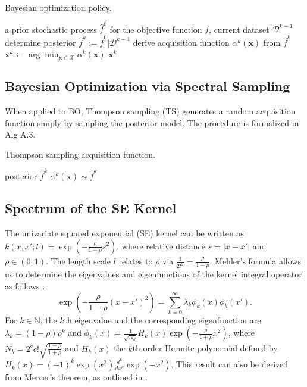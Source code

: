 \documentclass{article}
\begin{document}
\begin{algorithm}[h]
  \caption{Bayesian optimization policy.}
  \label{alg:BOpolicy}
  \begin{algorithmic}[1] %
    \Input a prior stochastic process $\widehat{f}^0$ for the objective function $f$, current dataset $\mathcal{D}^{k-1}$
    \State determine posterior
    $\widehat{f}^k := \widehat{f}^0 | \mathcal{D}^{k-1}$
    \State derive acquisition function $\alpha^k(\mathbf{x})$ from
    $\widehat{f}^k$
    \State $\mathbf{x}^k \gets \arg\min_{\mathbf{x} \in \mathcal{X}} \alpha^k(\mathbf{x})$
    \State \Return $\mathbf{x}^k$
  \end{algorithmic}
\end{algorithm}

\subsection{Bayesian Optimization via Spectral Sampling}

When applied to BO, Thompson sampling (TS) generates a random
acquisition function simply by sampling the posterior model. The
procedure is formalized in Alg A.3.

\begin{algorithm}[h]
  \caption{Thompson sampling acquisition function.}
  \label{alg:TS}
  \begin{algorithmic}[1] %
    \Input posterior $\widehat{f}^k$
    \State \Return $\alpha^k(\mathbf{x}) \sim \widehat{f}^k$
  \end{algorithmic}
\end{algorithm}


\subsection{Spectrum of the SE Kernel}
\label{sec:SEspectrum}

The univariate squared exponential (SE) kernel can be written as
$k(x, x'; l) = \exp(-\frac{\rho}{1-\rho} s^2)$, where relative distance $s = |x - x'|$ and $\rho \in (0,1)$.
The length scale $l$ relates to $\rho$ via $\frac{1}{2 l^2} = \frac{\rho}{1-\rho}$.
Mehler's formula allows us to determine the eigenvalues and eigenfunctions of the kernel integral operator as follows \cite{Vinaroz2022}:
\begin{equation}\label{eqn621}
	\exp(-\frac{\rho}{1-\rho} (x - x')^2) = \sum_{k=0}^{\infty} \lambda_k \phi_k(x) \phi_k(x').
\end{equation} 
For $k \in \mathbb{N}$, the $k$th eigenvalue and the corresponding eigenfunction are $\lambda_k = (1-\rho) \rho^k$ and
$\phi_k(x) = \frac{1}{\sqrt{N_k}} H_k(x) \exp\left(-\frac{\rho}{1+\rho} x^2\right)$, where $N_k = 2^c c! \sqrt{\frac{1-\rho}{1+\rho}}$ and $H_k(x)$ the $k$th-order Hermite polynomial defined by
$H_k(x) = (-1)^k \exp(x^2) \frac{d^k}{dx^k} \exp(-x^2)$.
This result can also be derived from Mercer's theorem, as outlined in \cite{ZhuHY1998}.
\end{document}
